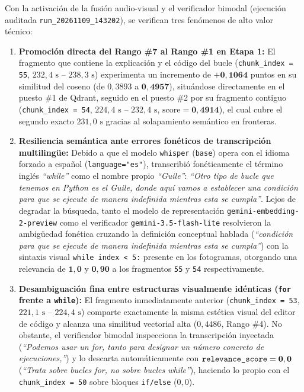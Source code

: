 Con la activación de la fusión audio-visual y el verificador bimodal (ejecución auditada \texttt{run\_20261109\_143202}), se verifican tres fenómenos de alto valor técnico: %
\begin{enumerate}
    \item \textbf{Promoción directa del Rango \#7 al Rango \#1 en Etapa 1:} El fragmento que contiene la explicación y el código del bucle (\texttt{chunk\_index = 55}, $232,4\text{ s -- }238,3\text{ s}$) experimenta un incremento de $\mathbf{+0,1064}$ puntos en su similitud del coseno (de $0,3893$ a $\mathbf{0,4957}$), situándose directamente en el puesto \#1 de Qdrant, seguido en el puesto \#2 por su fragmento contiguo (\texttt{chunk\_index = 54}, $224,4\text{ s -- }232,4\text{ s}$, $\text{score} = \mathbf{0,4914}$), el cual cubre el segundo exacto $231,0\text{ s}$ gracias al solapamiento semántico en fronteras. %
    \item \textbf{Resiliencia semántica ante errores fonéticos de transcripción multilingüe:} Debido a que el modelo \texttt{whisper} (\texttt{base}) opera con el idioma forzado a español (\texttt{language="es"}), transcribió fonéticamente el término inglés \textit{``while''} como el nombre propio \textit{``Guile''}: \textit{``Otro tipo de bucle que tenemos en Python es el Guile, donde aquí vamos a establecer una condición para que se ejecute de manera indefinida mientras esta se cumpla''}. %
    Lejos de degradar la búsqueda, tanto el modelo de representación \texttt{gemini-embedding-2-preview} como el verificador \texttt{gemini-3.5-flash-lite} resolvieron la ambigüedad fonética cruzando la definición conceptual hablada (\textit{``condición para que se ejecute de manera indefinida mientras esta se cumpla''}) con la sintaxis visual \texttt{while index < 5:} presente en los fotogramas, otorgando una relevancia de $\mathbf{1,0}$ y $\mathbf{0,90}$ a los fragmentos \texttt{55} y \texttt{54} respectivamente. %
    \item \textbf{Desambiguación fina entre estructuras visualmente idénticas (\texttt{for} frente a \texttt{while}):} El fragmento inmediatamente anterior (\texttt{chunk\_index = 53}, $221,1\text{ s -- }224,4\text{ s}$) comparte exactamente la misma estética visual del editor de código y alcanza una similitud vectorial alta ($0,4486$, Rango \#4). %
    No obstante, el verificador bimodal inspecciona la transcripción inyectada (\textit{``Podemos usar un for, tanto para designar un número concreto de ejecuciones,''}) y lo descarta automáticamente con $\text{\texttt{relevance\_score}} = \mathbf{0,0}$ (\textit{``Trata sobre bucles for, no sobre bucles while''}), haciendo lo propio con el \texttt{chunk\_index = 50} sobre bloques \texttt{if/else} ($0,0$). %
\end{enumerate}

